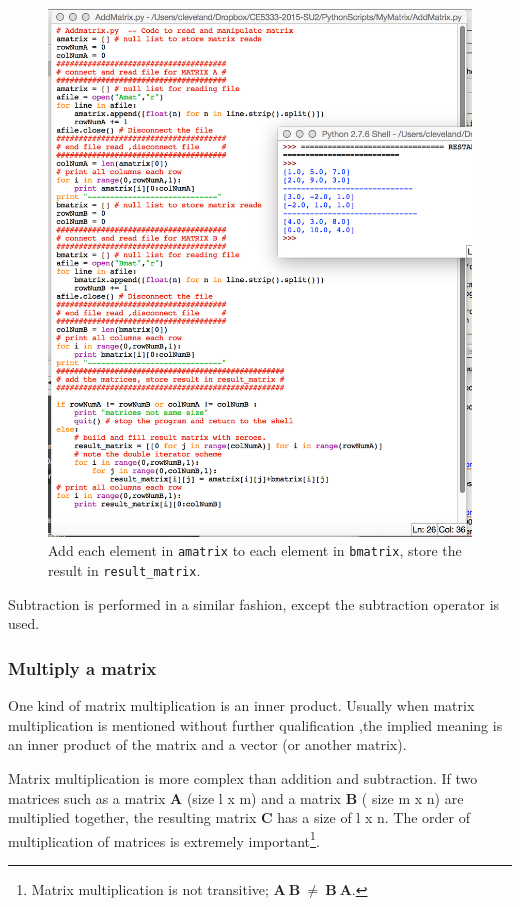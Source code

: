 \begin{figure}[h!] %
   \centering
   \includegraphics[width=6in]{./9-Matrix/AddMatrix.jpg} 
   \caption{Add each element in \texttt{amatrix} to each element in \texttt{bmatrix}, store the result in \texttt{result\_matrix}.}
   \label{fig:AddMatrix}
\end{figure}

Subtraction is performed in a similar fashion, except the subtraction operator is used.  
\clearpage
\subsubsection{Multiply a matrix}
One kind of matrix multiplication is an inner product.  
Usually when matrix multiplication is mentioned without further qualification ,the implied meaning is an inner product of the matrix and a vector (or another matrix).

Matrix multiplication is  more complex than addition and subtraction.  
If two matrices such as a matrix $\mathbf{A}$ (size l x m) and a matrix $\mathbf{B}$ ( size m x n) are multiplied together, the resulting matrix $\mathbf{C}$ has a size of l x n.  
The order of multiplication of matrices is extremely important\footnote{Matrix multiplication is not  transitive;  $\mathbf{A}~\mathbf{B} ~\ne~  \mathbf{B}~\mathbf{A}$.}.  

